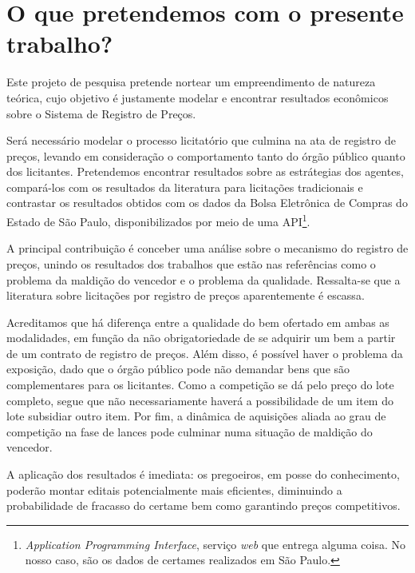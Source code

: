 
\chapter{O que pretendemos com o presente trabalho?}
\label{cap:objetivo}

Este projeto de pesquisa pretende nortear um empreendimento de natureza teórica, cujo objetivo é justamente modelar e encontrar resultados econômicos sobre o Sistema de Registro de Preços.

Será necessário modelar o processo licitatório que culmina na ata de registro de preços, levando em consideração o comportamento tanto do órgão público quanto dos licitantes. Pretendemos encontrar resultados sobre as estrátegias dos agentes, compará-los com os resultados da literatura para licitações tradicionais e contrastar os resultados obtidos com os dados da Bolsa Eletrônica de Compras do Estado de São Paulo, disponibilizados por meio de uma API\footnote{\emph{Application Programming Interface}, serviço \emph{web} que entrega alguma coisa. No nosso caso, são os dados de certames realizados em São Paulo.}.

A principal contribuição é conceber uma análise sobre o mecanismo do registro de preços, unindo os resultados dos trabalhos que estão nas referências como o problema da maldição do vencedor e o problema da qualidade. Ressalta-se que a literatura sobre licitações por registro de preços aparentemente é escassa.

Acreditamos que há diferença entre a qualidade do bem ofertado em ambas as modalidades, em função da não obrigatoriedade de se adquirir um bem a partir de um contrato de registro de preços. Além disso, é possível haver o problema da exposição, dado que o órgão público pode não demandar bens que são complementares para os licitantes. Como a competição se dá pelo preço do lote completo, segue que não necessariamente haverá a possibilidade de um item do lote subsidiar outro item. Por fim, a dinâmica de aquisições aliada ao grau de competição na fase de lances pode culminar numa situação de maldição do vencedor.

A aplicação dos resultados é imediata: os pregoeiros, em posse do conhecimento, poderão montar editais potencialmente mais eficientes, diminuindo a probabilidade de fracasso do certame bem como garantindo preços competitivos.

